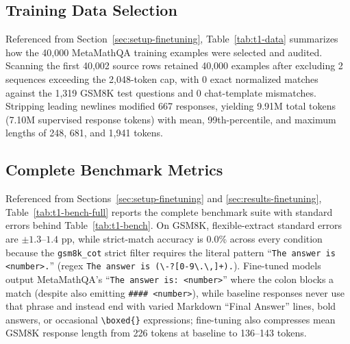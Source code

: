 \documentclass{article}
\begin{document}
\subsection{Training Data Selection}
\label{app:ft-data}
Referenced from Section~\ref{sec:setup-finetuning}, Table~\ref{tab:t1-data} summarizes how the 40,000 MetaMathQA training examples were selected and audited. Scanning the first 40,002 source rows retained 40,000 examples after excluding 2 sequences exceeding the 2,048-token cap, with 0 exact normalized matches against the 1,319 GSM8K test questions and 0 chat-template mismatches. Stripping leading newlines modified 667 responses, yielding 9.91M total tokens (7.10M supervised response tokens) with mean, 99th-percentile, and maximum lengths of 248, 681, and 1,941 tokens.


\subsection{Complete Benchmark Metrics}
\label{app:ft-bench}
Referenced from Sections~\ref{sec:setup-finetuning} and \ref{sec:results-finetuning}, Table~\ref{tab:t1-bench-full} reports the complete benchmark suite with standard errors behind Table~\ref{tab:t1-bench}. On GSM8K, flexible-extract standard errors are $\pm 1.3$--$1.4$ pp, while strict-match accuracy is 0.0\% across every condition because the \texttt{gsm8k\_cot} strict filter requires the literal pattern ``\texttt{The answer is <number>.}'' (regex \texttt{The answer is (\textbackslash -?[0-9\textbackslash .\textbackslash ,]+).}). Fine-tuned models output MetaMathQA's ``\texttt{The answer is: <number>}'' where the colon blocks a match (despite also emitting \texttt{\#\#\#\# <number>}), while baseline responses never use that phrase and instead end with varied Markdown ``Final Answer'' lines, bold answers, or occasional \texttt{\textbackslash boxed\{\}} expressions; fine-tuning also compresses mean GSM8K response length from 226 tokens at baseline to 136--143 tokens.

\end{document}
